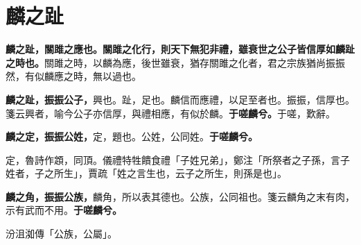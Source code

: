 \section{麟之趾}


\textbf{麟之趾，關雎之應也。關雎之化行，則天下無犯非禮，雖衰世之公子皆信厚如麟趾之時也。}{\footnotesize 關雎之時，以麟為應，後世雖衰，猶存關雎之化者，君之宗族猶尚振振然，有似麟應之時，無以過也。}

\textbf{麟之趾，振振公子，}{\footnotesize 興也。趾，足也。麟信而應禮，以足至者也。振振，信厚也。箋云興者，喻今公子亦信厚，與禮相應，有似於麟。}\textbf{于嗟麟兮。}{\footnotesize 于嗟，歎辭。}

\textbf{麟之定，振振公姓，}{\footnotesize 定，題也。公姓，公同姓。}\textbf{于嗟麟兮。}

\begin{quoting}定，魯詩作顁，同頂。儀禮特牲饋食禮「子姓兄弟」，鄭注「所祭者之子孫，言子姓者，子之所生」，賈疏「姓之言生也，云子之所生，則孫是也」。\end{quoting}

\textbf{麟之角，振振公族，}{\footnotesize 麟角，所以表其德也。公族，公同祖也。箋云麟角之末有肉，示有武而不用。}\textbf{于嗟麟兮。}

\begin{quoting}汾沮洳傳「公族，公屬」。\end{quoting}

